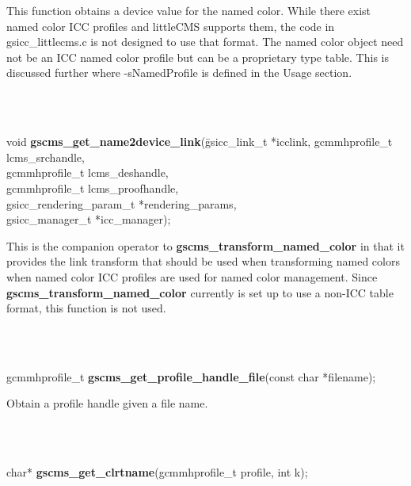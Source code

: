 \documentclass[12pt,notitlepage]{article}
\begin{document}
\begin{minipage}[h]{6.0in}
 This function obtains a device value for the named color.  While there exist named color ICC profiles and littleCMS supports them, the code in gsicc\_littlecms.c is not designed to use that format.   The named color object need not be an ICC named color profile but can be a proprietary type table. This is discussed further where -sNamedProfile is defined in the Usage section.
\end{minipage}\\
\\

\begin{tabbing}
\noindent void {\bf gscms\_get\_name2device\_link}(\=gsicc\_link\_t *icclink, gcmmhprofile\_t
lcms\_srchandle, \\
\> gcmmhprofile\_t lcms\_deshandle, \\
\> gcmmhprofile\_t lcms\_proofhandle,\\
\> gsicc\_rendering\_param\_t *rendering\_params, \\
\> gsicc\_manager\_t *icc\_manager);\\
\end{tabbing}

\begin{minipage}[h]{6.0in}
This is the companion operator to {\bf gscms\_transform\_named\_color} in that it provides the link transform that should be used when transforming named colors when named color ICC profiles are used for named color management.  Since {\bf gscms\_transform\_named\_color} currently is set up to use a non-ICC table format, this function is not used.
\end{minipage}\\
\\

\begin{tabbing}
\noindent gcmmhprofile\_t {\bf gscms\_get\_profile\_handle\_file}(const char *filename);\\
\end{tabbing}

\begin{minipage}[h]{6.0in}
Obtain a profile handle given a file name.
\end{minipage}\\
\\

\begin{tabbing}
\noindent char* {\bf gscms\_get\_clrtname}(gcmmhprofile\_t profile, int k);\\
\end{tabbing}
\end{document}
